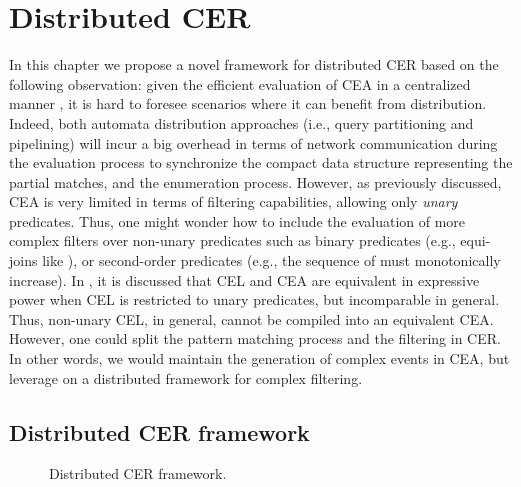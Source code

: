 \chapter{Distributed CER}\label{chapter:distributed-cer}

In this chapter we propose a novel framework for distributed CER based on the following observation: given the efficient evaluation of CEA in a centralized manner \cite{formal-framework-cer, core}, it is hard to foresee scenarios where it can benefit from distribution. Indeed, both automata distribution approaches (i.e., query partitioning and pipelining) will incur a big overhead in terms of network communication during the evaluation process to synchronize the compact data structure representing the partial matches, and the enumeration process. However, as previously discussed, CEA is very limited in terms of filtering capabilities, allowing only \emph{unary} predicates. Thus, one might wonder how to include the evaluation of more complex filters over non-unary predicates such as binary predicates (e.g., equi-joins like ), or second-order predicates (e.g., the sequence of  must monotonically increase). In \cite{on-the-expressiveness}, it is discussed that CEL and CEA are equivalent in expressive power when CEL is restricted to unary predicates, but incomparable in general. Thus, non-unary CEL, in general, cannot be compiled into an equivalent CEA. However, one could split the pattern matching process and the filtering in CER. In other words, we would maintain the generation of complex events in CEA, but leverage on a distributed framework for complex filtering.

\section{Distributed CER framework}\label{sec:framework}

\begin{figure}[t]
  \centering
  \caption{Distributed CER framework.}
  \label{fig:framework}
\end{figure}

